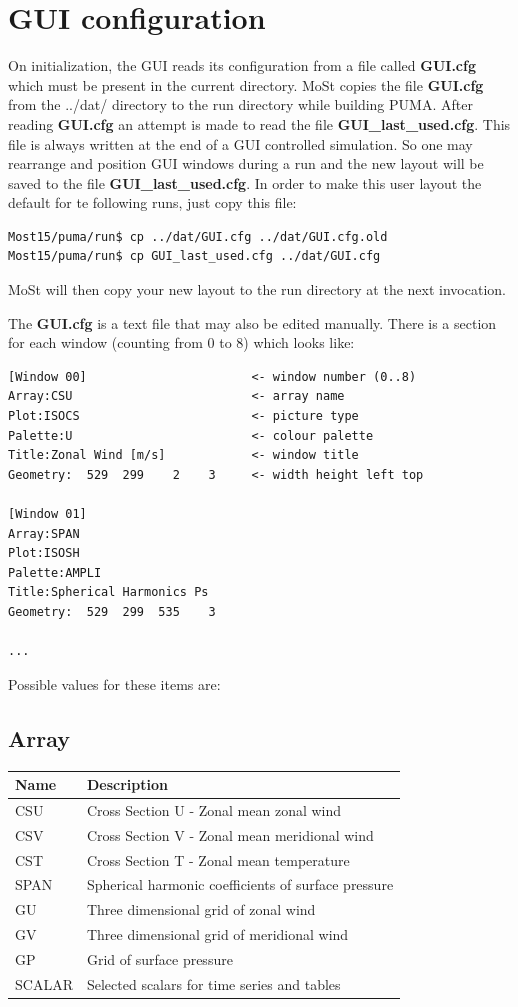\section{GUI configuration}

On initialization, the GUI reads its configuration from a file called
{\bf GUI.cfg} which must be present in the current directory.
MoSt copies the file {\bf GUI.cfg} from the ../dat/ directory
to the run directory while building PUMA.
After reading {\bf GUI.cfg} an attempt is made to read the file
{\bf GUI\_last\_used.cfg}. This file is always written at the end
of a GUI controlled simulation. So one may rearrange and position
GUI windows during a run and the new layout will be saved to the
file {\bf GUI\_last\_used.cfg}. In order to make this user
layout the default for te following runs, just copy this file:
\begin{verbatim}
Most15/puma/run$ cp ../dat/GUI.cfg ../dat/GUI.cfg.old
Most15/puma/run$ cp GUI_last_used.cfg ../dat/GUI.cfg
\end{verbatim}
MoSt will then copy your new layout to the run directory at 
the next invocation.

The {\bf GUI.cfg} is a text file that may also be edited manually.
There is a section for each window (counting from 0 to 8) which
looks like:

\begin{verbatim}
[Window 00]                       <- window number (0..8)
Array:CSU                         <- array name
Plot:ISOCS                        <- picture type
Palette:U                         <- colour palette
Title:Zonal Wind [m/s]            <- window title
Geometry:  529  299    2    3     <- width height left top

[Window 01]
Array:SPAN
Plot:ISOSH
Palette:AMPLI
Title:Spherical Harmonics Ps
Geometry:  529  299  535    3

...

\end{verbatim}

Possible values for these items are:

\subsection{Array}
\begin{tabular}{|l|l|}
\hline
Name     & Description \\
\hline
CSU      & Cross Section U - Zonal mean zonal wind \\
CSV      & Cross Section V - Zonal mean meridional wind \\
CST      & Cross Section T - Zonal mean temperature \\
SPAN     & Spherical harmonic coefficients of surface pressure \\
GU       & Three dimensional grid of zonal wind \\
GV       & Three dimensional grid of meridional wind \\
GP       & Grid of surface pressure \\
SCALAR   & Selected scalars for time series and tables \\
\hline
\end{tabular}


